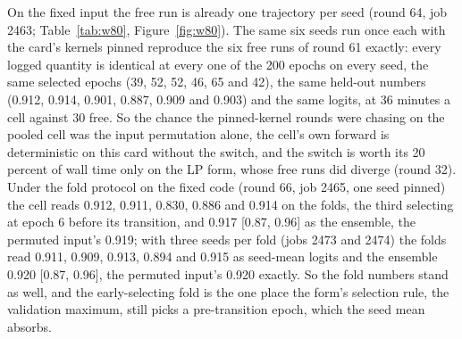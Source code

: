 On the fixed input the free run is already one trajectory per seed (round 64, job
2463; Table~\ref{tab:w80}, Figure~\ref{fig:w80}). The same six seeds run once each
with the card's kernels pinned reproduce the six free runs of round 61 exactly: every
logged quantity is identical at every one of the 200 epochs on every seed, the same
selected epochs (39, 52, 52, 46, 65 and 42), the same held-out numbers (0.912, 0.914,
0.901, 0.887, 0.909 and 0.903) and the same logits, at 36 minutes a cell against 30
free. So the chance the pinned-kernel rounds were chasing on the pooled cell was the
input permutation alone, the cell's own forward is deterministic on this card
without the switch, and the switch is worth its 20 percent of wall time only on the
LP form, whose free runs did diverge (round 32). Under the fold protocol on the fixed
code (round 66, job 2465, one seed pinned) the cell reads 0.912, 0.911, 0.830, 0.886
and 0.914 on the folds, the third selecting at epoch 6 before its transition, and
0.917 [0.87, 0.96] as the ensemble, the permuted input's 0.919; with three seeds per
fold (jobs 2473 and 2474) the folds read 0.911, 0.909, 0.913, 0.894 and 0.915 as
seed-mean logits and the ensemble 0.920 [0.87, 0.96], the permuted input's 0.920
exactly. So the fold numbers stand as well, and the early-selecting fold is the one
place the form's selection rule, the validation maximum, still picks a pre-transition
epoch, which the seed mean absorbs.









